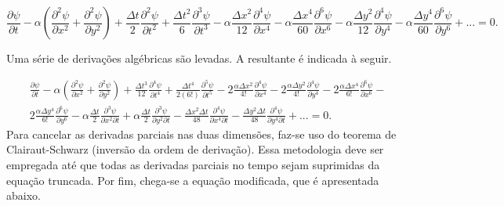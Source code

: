 \documentclass[a0,portrait]{a0poster}
\begin{document}
\begin{minipage}[c]{\linewidth}
\begin{framed}
\begin{multicols}{2}
\begin{equation} \label{difusao_continuum2}
\frac{\partial \psi}{\partial t} - \alpha \left(\frac{\partial^{2} \psi}{\partial x^{2}} + \frac{\partial^{2} \psi}{\partial y^{2}} \right) + \frac{\Delta t}{2} \frac{\partial^{2} \psi}{\partial t^{2}} + \frac{\Delta t^{2}}{6} \frac{\partial^{3} \psi}{\partial t^{3}} - \alpha \frac{\Delta x^{2}}{12} \frac{\partial^{4} \psi}{\partial x^{4}} - \alpha \frac{\Delta x^{4}}{60} \frac{\partial^{6} \psi}{\partial x^{6}} - \alpha \frac{\Delta y^{2}}{12} \frac{\partial^{4} \psi}{\partial y^{4}} - \alpha \frac{\Delta y^{4}}{60} \frac{\partial^{6} \psi}{\partial y^{6}} +  ... = 0.
\end{equation}

Uma série de derivações algébricas são levadas. A resultante é indicada à seguir.

\begin{equation} \label{termo_temporal_tres}
\begin{split}
&\frac{\partial \psi}{\partial t} - \alpha \left(\frac{\partial^{2} \psi}{\partial x^{2}} + \frac{\partial^{2} \psi}{\partial y^{2}} \right) +\frac{\Delta t^{3}}{12} \frac{\partial^{4}\psi}{\partial t^{4}} + \frac{\Delta t^{4}}{2(6!)} \frac{\partial^{5}\psi}{\partial t^{5}}- 2 \frac{\alpha \Delta x^{2}}{4!} \frac{\partial^{4} \psi}{\partial x^{4}} - 2 \frac{\alpha \Delta y^{2}}{4!} \frac{\partial^{4} \psi}{\partial y^{4}} - 2 \frac{\alpha \Delta x^{4}}{6!} \frac{\partial^{6} \psi}{\partial x^{6}} - \\
&2 \frac{\alpha \Delta y^{4}}{6!} \frac{\partial^{6} \psi}{\partial y^{6}} - \alpha \frac{\Delta t}{2} \frac{\partial^{3} \psi}{\partial x^{2} \partial t} + \alpha \frac{\Delta t}{2} \frac{\partial^{3} \psi}{\partial y^{2} \partial t} - \frac{\Delta x^{2} \Delta t}{48} \frac{\partial^{4} \psi}{\partial x^{4} \partial t} - \frac{\Delta y^{2} \Delta t}{48} \frac{\partial^{4} \psi}{\partial y^{4} \partial t}  +... = 0.
\end{split}
\end{equation}	
Para cancelar as derivadas parciais nas duas dimensões, faz-se uso do teorema de Clairaut-Schwarz (inversão da ordem de derivação). Essa metodologia deve ser empregada até que todas as derivadas parciais no tempo sejam suprimidas da equação truncada. Por fim, chega-se a equação modificada, que é apresentada abaixo.


\end{multicols}
\end{framed}
\end{minipage}
\end{document}
